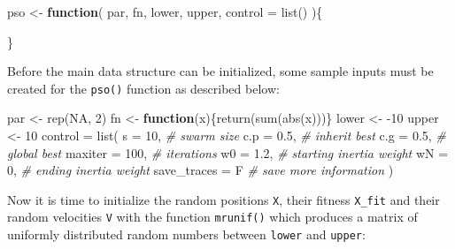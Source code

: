 \documentclass[
  oneside]{book}
\newenvironment{Shaded}{\begin{snugshade}}{\end{snugshade}}
\newcommand{\AttributeTok}[1]{\textcolor[rgb]{0.77,0.63,0.00}{#1}}
\newcommand{\CommentTok}[1]{\textcolor[rgb]{0.56,0.35,0.01}{\textit{#1}}}
\newcommand{\ConstantTok}[1]{\textcolor[rgb]{0.00,0.00,0.00}{#1}}
\newcommand{\ControlFlowTok}[1]{\textcolor[rgb]{0.13,0.29,0.53}{\textbf{#1}}}
\newcommand{\DecValTok}[1]{\textcolor[rgb]{0.00,0.00,0.81}{#1}}
\newcommand{\FloatTok}[1]{\textcolor[rgb]{0.00,0.00,0.81}{#1}}
\newcommand{\FunctionTok}[1]{\textcolor[rgb]{0.00,0.00,0.00}{#1}}
\newcommand{\NormalTok}[1]{#1}
\newcommand{\OtherTok}[1]{\textcolor[rgb]{0.56,0.35,0.01}{#1}}
\newcommand{\SpecialCharTok}[1]{\textcolor[rgb]{0.00,0.00,0.00}{#1}}
\begin{document}
\begin{Shaded}
\begin{Highlighting}[]
\NormalTok{pso }\OtherTok{\textless{}{-}} \ControlFlowTok{function}\NormalTok{(}
\NormalTok{    par, }
\NormalTok{    fn, }
\NormalTok{    lower, }
\NormalTok{    upper, }
    \AttributeTok{control =} \FunctionTok{list}\NormalTok{()}
\NormalTok{  )\{}

\NormalTok{\}}
\end{Highlighting}
\end{Shaded}

Before the main data structure can be initialized, some sample inputs must be created for the \texttt{pso()} function as described below:

\begin{Shaded}
\begin{Highlighting}[]
\NormalTok{par }\OtherTok{\textless{}{-}} \FunctionTok{rep}\NormalTok{(}\ConstantTok{NA}\NormalTok{, }\DecValTok{2}\NormalTok{)}
\NormalTok{fn }\OtherTok{\textless{}{-}} \ControlFlowTok{function}\NormalTok{(x)\{}\FunctionTok{return}\NormalTok{(}\FunctionTok{sum}\NormalTok{(}\FunctionTok{abs}\NormalTok{(x)))\}}
\NormalTok{lower }\OtherTok{\textless{}{-}} \SpecialCharTok{{-}}\DecValTok{10}
\NormalTok{upper }\OtherTok{\textless{}{-}} \DecValTok{10}
\NormalTok{control }\OtherTok{=} \FunctionTok{list}\NormalTok{(}
  \AttributeTok{s =} \DecValTok{10}\NormalTok{, }\CommentTok{\# swarm size}
  \AttributeTok{c.p =} \FloatTok{0.5}\NormalTok{, }\CommentTok{\# inherit best}
  \AttributeTok{c.g =} \FloatTok{0.5}\NormalTok{, }\CommentTok{\# global best}
  \AttributeTok{maxiter =} \DecValTok{100}\NormalTok{, }\CommentTok{\# iterations}
  \AttributeTok{w0 =} \FloatTok{1.2}\NormalTok{, }\CommentTok{\# starting inertia weight}
  \AttributeTok{wN =} \DecValTok{0}\NormalTok{, }\CommentTok{\# ending inertia weight}
  \AttributeTok{save\_traces =}\NormalTok{ F }\CommentTok{\# save more information}
\NormalTok{)}
\end{Highlighting}
\end{Shaded}

Now it is time to initialize the random positions \texttt{X}, their fitness \texttt{X\_fit} and their random velocities \texttt{V} with the function \texttt{mrunif()} which produces a matrix of uniformly distributed random numbers between \texttt{lower} and \texttt{upper}:
\end{document}
